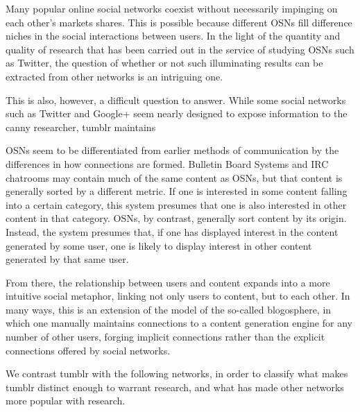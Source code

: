 Many popular online social networks coexist without necessarily 
impinging on each other's markets shares.  This is possible because 
different OSNs fill difference niches in the social interactions 
between users.  In the light of the quantity and quality of research 
that has been carried out in the service of studying OSNs such as 
Twitter, the question of whether or not such illuminating results 
can be extracted from other networks is an intriguing one.  

This is also, however, a difficult question to answer.  While some 
social networks such as Twitter and Google+ seem nearly designed to 
expose information to the canny researcher, tumblr maintains 



OSNs seem to be differentiated from earlier methods of communication by 
the differences in how connections are formed.  Bulletin Board Systems and
IRC chatrooms may contain much of the same content as OSNs, but that 
content is generally sorted by a different metric.  If one is interested in 
some content falling into a certain category, this system presumes that one is 
also interested in other content in that category.  OSNs, by contrast, 
generally sort content by its origin.  Instead, the system presumes that, 
if one has displayed interest in the content generated by some user, one is 
likely to display interest in other content generated by that same user.

From there, the relationship between users and content expands into a 
more intuitive social metaphor, linking not only users to content, but 
to each other.  In many ways, this is an extension of the model of the 
so-called blogosphere, in which one manually maintains connections to 
a content generation engine for any number of other users, forging 
implicit connections rather than the explicit connections offered by 
social networks. 




 We contrast tumblr with the following networks, in order to classify 
what makes tumblr distinct enough to warrant research, and what has 
made other networks more popular with research.

